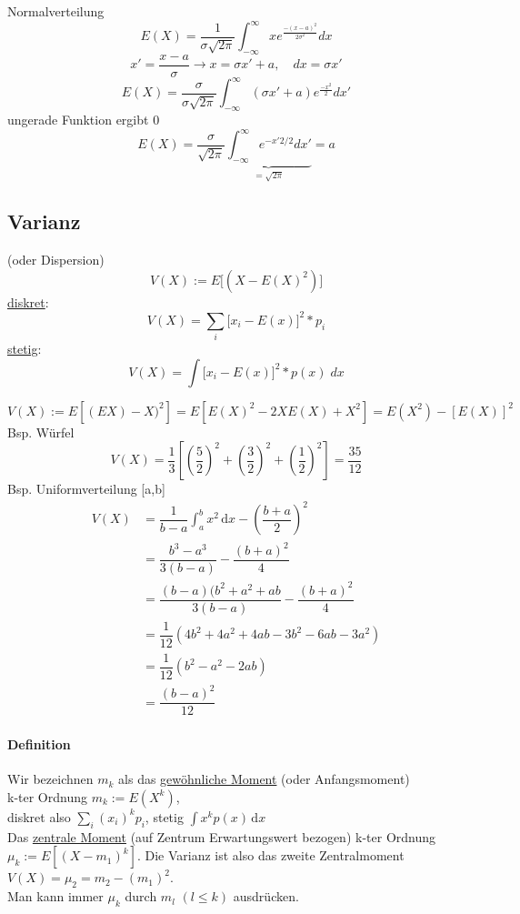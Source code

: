 \begin{exmp}
	Normalverteilung
\[ E(X)= \frac{1}{\sigma \sqrt{2 \pi}} \int_{-\infty}^{\infty} x e^{\frac{-(x-a)^2}{2\sigma^2}} dx \]
\[ x' = \frac{x-a}{\sigma} \rightarrow x = \sigma x' + a ,\quad dx= \sigma x' \]
\[ E(X) = \frac{\sigma}{\sigma \sqrt{2 \pi}} \int_{- \infty}^{\infty} (\sigma x' + a) e^{\frac{-x^2}{2}} dx' \]
ungerade Funktion ergibt 0
\[ E(X) = \frac{\sigma}{\sqrt{2 \pi}} \underbrace{\int_{- \infty}^{\infty} e^{-x' 2/2} dx'}_{=\sqrt{2 \pi}} = a \]
\end{exmp}

\subsection{Varianz} (oder Dispersion)
\[ V(X) := E \big[ (X-E(X)^2) \big] \]
\underline{diskret}: 
\[ V(X) = \sum\limits_{i} \big[ x_i - E(x) \big] ^2 * p_i \]
\underline{stetig}: 
\[ V(X) = \int \big[ x_i - E(x) \big] ^2 * p(x)\; dx \]


\[
V(X) := E[(EX)-X)^2] = E[E(X)^2 - 2X E(X) + X^2]  = E(X^2) - [E(X)]^2
\]
Bsp. Würfel
\[
V(X) = \dfrac{1}{3} \left[\left(\dfrac{5}{2}\right)^2 + \left(\dfrac{3}{2}\right)^2 + \left(\dfrac{1}{2}\right)^2\right] = \dfrac{35}{12}
\]
Bsp. Uniformverteilung [a,b]
\begin{align*}
V(X) &= \dfrac{1}{b-a} \int_a^b \! x^2 \, \mathrm{d}x - \left(\dfrac{b+a}{2}\right)^2\\
&= \dfrac{b^3 - a^3}{3 (b-a)} - \dfrac{(b+a)^2}{4} \\
&= \dfrac{(b-a) (b^2+a^2+ab}{3(b-a)} - \dfrac{(b+a)^2}{4}\\
&= \dfrac{1}{12} (4b^2+4a^2+4ab-3b^2-6 ab-3a^2)\\
&= \dfrac{1}{12} (b^2-a^2-2ab) \\
&= \dfrac{(b-a)^2}{12}
\end{align*}
\paragraph{Definition}
Wir bezeichnen $m_k$ als das \underline{gewöhnliche Moment} (oder Anfangsmoment)\\
k-ter Ordnung $m_k := E(X^k)$, \\
diskret also $\sum_i\left(x_i\right)^k p_i$,
stetig $\int \! x^k p(x) \, \mathrm{d}x$
\\
Das \underline{zentrale Moment} (auf Zentrum Erwartungswert bezogen) k-ter Ordnung \\
$\mu_k := E\left[(X-m_1)^k\right]$. Die Varianz ist also das zweite Zentralmoment $V(X) = \mu_2 = m_2 - (m_1)^2$.\\
Man kann immer $\mu_k$ durch $m_l$ $\left( l \leq k\right)$ ausdrücken.


